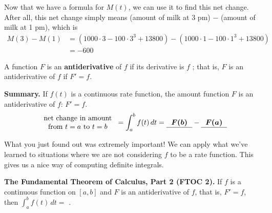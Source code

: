 \documentclass[main]{subfiles}
\begin{document}
\begin{enumerate}
\begin{enumerate}
    \begin{solution}
      Now that we have a formula for $M(t)$, we can use it to find this
      net change.  After all, this net change simply means (amount of milk
      at 3 pm) $-$ (amount of milk at 1 pm), which is
      \begin{align*}
        M(3) - M(1) &= \left( 1000 \cdot 3 - 100 \cdot 3^3 + 13800 \right)
        - \left( 1000 \cdot 1 - 100 \cdot 1^3 + 13800 \right) \\
        &= \boxed{-600}
      \end{align*}
    \end{solution}

  \end{enumerate}

\end{enumerate}

\begin{framed}
    A function $F$ is an \textbf{antiderivative} of $f$ if its derivative is $f$ ; that is, $F$ is an antiderivative of $f$ if $F'= f $.
\end{framed}

\begin{framed}
    \textbf{Summary.} If $f(t)$ is a continuous rate function, the
    amount function $F$ is an antiderivative of $f$: $F'=f$.
    \[
    \begin{tabular}{c}
    \text{net change in amount}\\
    \text{from $t=a$ to $t=b$}
    \end{tabular}
    = \int_a^b f(t)\,dt = \cfitb{0.5in}{F(b)} - \cfitb{0.5in}{F(a)}
    \]
\end{framed}
\vspace{-8pt}
What you just found out was extremely important! We can apply what we've
learned to situations where we are not considering $f$ to be a rate 
function. This gives us a nice way of computing definite integrals.

\begin{framed}
  \textbf{The Fundamental Theorem of Calculus, Part 2 (FTOC 2).} If $f$ is
  a continuous function on $[a, b]$ and $F$ is an antiderivative of $f$,
  that is, $F'=f$, then $\displaystyle \int_a^b f(t)\,dt
  = {}$ . 
\end{framed}
\pspace{\newpage}
\end{document}
